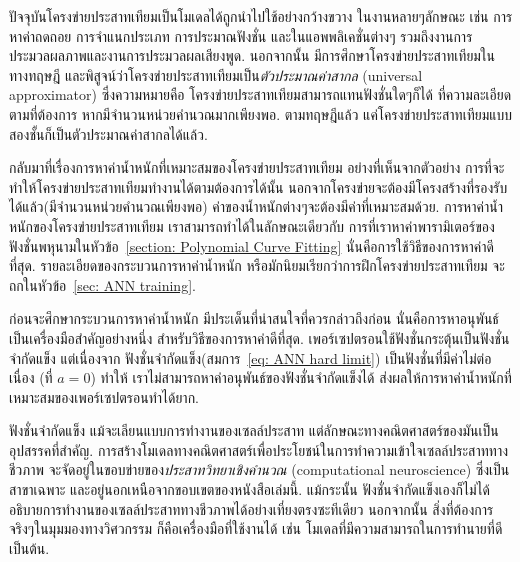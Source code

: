 %
ปัจจุบันโครงข่ายประสาทเทียมเป็นโมเดลได้ถูกนำไปใช้อย่างกว้างขวาง ในงานหลายๆลักษณะ เช่น การหาค่าถดถอย การจำแนกประเภท การประมาณฟังชั่น และในแอพพลิเคชั่นต่างๆ รวมถึงงานการประมวลผลภาพและงานการประมวลผลเสียงพูด.
%
นอกจากนั้น มีการศึกษาโครงข่ายประสาทเทียมในทางทฤษฎี และพิสูจน์ว่าโครงข่ายประสาทเทียมเป็น\textit{ตัวประมาณค่าสากล} (universal approximator)\cite{Cybenko1989a, Hornik1991a}
ซึ่งความหมายคือ 
โครงข่ายประสาทเทียมสามารถแทนฟังชั่นใดๆก็ได้ ที่ความละเอียดตามที่ต้องการ หากมีจำนวนหน่วยคำนวณมากเพียงพอ.
ตามทฤษฎีแล้ว แค่โครงข่ายประสาทเทียมแบบสองชั้นก็เป็นตัวประมาณค่าสากลได้แล้ว.
%

กลับมาที่เรื่องการหาค่าน้ำหนักที่เหมาะสมของโครงข่ายประสาทเทียม 
อย่างที่เห็นจากตัวอย่าง การที่จะทำให้โครงข่ายประสาทเทียมทำงานได้ตามต้องการได้นั้น 
นอกจากโครงข่ายจะต้องมีโครงสร้างที่รองรับได้แล้ว(มีจำนวนหน่วยคำนวณเพียงพอ) 
ค่าของน้ำหนักต่างๆจะต้องมีค่าที่เหมาะสมด้วย.
การหาค่าน้ำหนักของโครงข่ายประสาทเทียม เราสามารถทำได้ในลักษณะเดียวกับ การที่เราหาค่าพารามิเตอร์ของฟังชั่นพหุนามในหัวข้อ~\ref{section: Polynomial Curve Fitting}
นั่นคือการใช้วิธีของการหาค่าดีที่สุด.
รายละเอียดของกระบวนการหาค่าน้ำหนัก หรือมักนิยมเรียกว่าการฝึกโครงข่ายประสาทเทียม จะถกในหัวข้อ~\ref{sec: ANN training}.

ก่อนจะศึกษากระบวนการหาค่าน้ำหนัก มีประเด็นที่น่าสนใจที่ควรกล่าวถึงก่อน 
นั่นคือการหาอนุพันธ์เป็นเครื่องมือสำคัญอย่างหนึ่ง สำหรับวิธีของการหาค่าดีที่สุด.
เพอร์เซปตรอนใช้ฟังชั่นกระตุ้นเป็นฟังชั่นจำกัดแข็ง
แต่เนื่องจาก ฟังชั่นจำกัดแข็ง(สมการ~\ref{eq: ANN hard limit}) เป็นฟังชั่นที่มีค่าไม่ต่อเนื่อง (ที่ $a = 0$) ทำให้ เราไม่สามารถหาค่าอนุพันธ์ของฟังชั่นจำกัดแข็งได้ ส่งผลให้การหาค่าน้ำหนักที่เหมาะสมของเพอร์เซปตรอนทำได้ยาก.

ฟังชั่นจำกัดแข็ง แม้จะเลียนแบบการทำงานของเซลล์ประสาท แต่ลักษณะทางคณิตศาสตร์ของมันเป็นอุปสรรคที่สำคัญ.
การสร้างโมเดลทางคณิตศาสตร์เพื่อประโยชน์ในการทำความเข้าใจเซลล์ประสาททางชีวภาพ 
จะจัดอยู่ในขอบข่ายของ\textit{ประสาทวิทยาเชิงคำนวณ} (computational neuroscience) 
ซึ่งเป็นสาขาเฉพาะ และอยู่นอกเหนือจากขอบเขตของหนังสือเล่มนี้.
%
แม้กระนั้น ฟังชั่นจำกัดแข็งเองก็ไม่ได้อธิบายการทำงานของเซลล์ประสาททางชีวภาพได้อย่างเที่ยงตรงซะทีเดียว
นอกจากนั้น สิ่งที่ต้องการจริงๆในมุมมองทางวิศวกรรม ก็คือเครื่องมือที่ใช้งานได้ เช่น โมเดลที่มีความสามารถในการทำนายที่ดี เป็นต้น.

